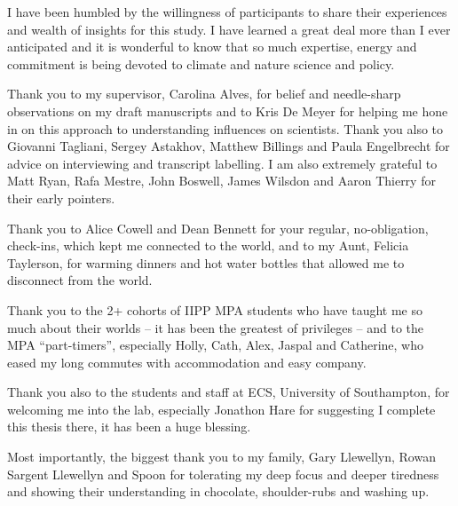 \fi
\begin{acknowledgements}
I have been humbled by the willingness of participants to share their experiences and wealth of insights for this study. I have learned a great deal more than I ever anticipated and it is wonderful to know that so much expertise, energy and commitment is being devoted to climate and nature science and policy. 

Thank you to my supervisor, Carolina Alves, for belief and needle-sharp observations on my draft manuscripts and to Kris De Meyer for helping me hone in on this approach to understanding influences on scientists. Thank you also to Giovanni Tagliani, Sergey Astakhov, Matthew Billings and Paula Engelbrecht for advice on interviewing and transcript labelling. I am also extremely grateful to Matt Ryan, Rafa Mestre, John Boswell, James Wilsdon and Aaron Thierry for their early pointers.

Thank you to Alice Cowell and Dean Bennett for your regular, no-obligation, check-ins, which kept me connected to the world, and to my Aunt, Felicia Taylerson, for warming dinners and hot water bottles that allowed me to disconnect from the world.

Thank you to the 2+ cohorts of IIPP MPA students who have taught me so much about their worlds -- it has been the greatest of privileges -- and to the MPA ``part-timers'', especially Holly, Cath, Alex, Jaspal and Catherine, who eased my long commutes with accommodation and easy company.

Thank you also to the students and staff at ECS, University of Southampton, for welcoming me into the lab, especially Jonathon Hare for suggesting I complete this thesis there, it has been a huge blessing. %

Most importantly, the biggest thank you to my family, Gary Llewellyn, Rowan Sargent Llewellyn and Spoon for tolerating my deep focus and deeper tiredness and showing their understanding in chocolate, shoulder-rubs and washing up.
\end{acknowledgements}


\setcounter{tocdepth}{2} 

\tableofcontents
\listoffigures
\listoftables
%
\printglossary[title=List of Abbreviations,type=\acronymtype]
